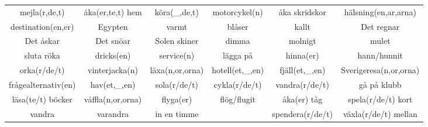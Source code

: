 \begin{center}
\begin{adjustwidth}{-2.5cm}{}
\begin{tabular}{|c c c c c c|}
            mejla(r,de,t) & åka(er,te,t) hem & köra(\_,de,t) & motorcykel(n) & åka skridskor & hälsning(en,ar,arna) \\
            destination(en,er) & Egypten & varmt & blåser & kallt & Det regnar \\
            Det åskar & Det snöar & Solen skiner & dimma & molnigt & mulet \\
            sluta röka & dricks(en) & service(n) & lägga på & hinna(er) & hann/hunnit \\
            orka(r/de/t) & vinterjacka(n) & läxa(n,or,orna) & hotell(et,\_,en) & fjäll(et,\_,en) & Sverigeresa(n,or,orna) \\
            frågealternativ(en) & hav(et,\_,en) & sola(r/de/t) & cykla(r/de/t) & vandra(r/de/t) & gå på klubb \\
            läsa(te/t) böcker & våffla(n,or,orna) & flyga(er) & flög/flugit & åka(er) tåg & spela(r/de/t) kort \\
            vandra & varandra & in en timme &  & spendera(r/de/t) & växla(r/de/t) mellan \\
            \hline
        \end{tabular}
    \end{adjustwidth}
\end{center}

